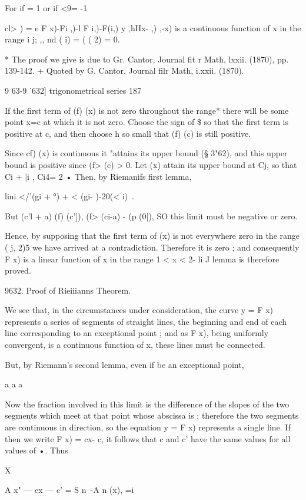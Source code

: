 {For if = 1 or if <9= -1

cl> ) = e F x)-Fi ,)-l F i,)-F(i,) y ,hHx- ,) ,-x) is a continuous
function of x in the range i j; ,, nd ( i) = ( ( 2) = 0.

* The proof we give is due to Gr. Cantor, Journal fit r Math, lxxii.
(1870), pp. 139-142. + Quoted by G. Cantor, Journal filr Math, i.xxii.
(1870).

9 63-9 '632] trigonometrical series 187

If the first term of (f) (x) is not zero throughout the range* there
will be some point x=c at which it is not zero. Choose the sign of \$
so that the first term is positive at c, and then choose h so small
that (f) (c) is still positive.

Since cf) (x) is continuous it "attains its upper bound (§ 3"62), and
this upper bound is positive since (f> (c) > 0. Let (x) attain its
upper bound at Cj, so that Ci + |i , Ci4= 2 • Then, by Riemanifs first
lemma,

lini </'(gi + °) + < (gi- )-20(< i)\ .

But (c'l + a) (f) (c']), (f> (ci-a) - (p (0|), SO this limit must be
negative or zero.

Hence, by supposing that the first term of (x) is not everywhere zero
in the range ( j, 2)5 we have arrived at a contradiction. Therefore it
is zero ; and consequently F x) is a linear function of x in the range
1 < x < 2- li J lemma is therefore proved.

9632. Proof of Rieiiianns Theorem.

We see that, in the circumstances under consideration, the curve y = F
x) represents a series of segments of straight lines, the beginning
and end of each line corresponding to an exceptional point ; and as F
x), being uniformly convergent, is a continuous function of x, these
lines must be connected.

But, by Riemann's second lemma, even if be an exceptional point,

a a a

Now the fraction involved in this limit is the difference of the
slopes of the two segments which meet at that point whose abscissa is
; therefore the two segments are continuous in direction, so the
equation y = F x) represents a single line. If then we write F x) =
cx- c, it follows that c and c' have the same values for all values of
•. Thus

X

 A x" — ex — c' = S n~-A n (x), =i

}
